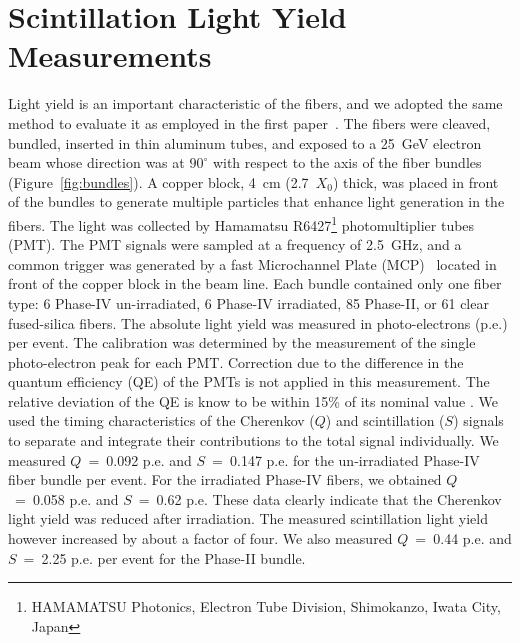 \documentclass[a4paper,11pt]{article}
\begin{document}
\section{Scintillation Light Yield Measurements}
\label{sec:lightyield}
Light yield is an important characteristic of the fibers, and we adopted the same method to evaluate it as employed in the first paper~\cite{JINSTPaper}.   The fibers were cleaved, bundled, inserted in thin aluminum tubes, and exposed to a 25~GeV electron beam whose direction was at $90^{\circ}$ with respect to the axis of the fiber bundles (Figure~\ref{fig:bundles}). A copper block, 4~cm (2.7~$X_0$) thick, was placed in front of the bundles to generate multiple particles that enhance light generation in the fibers. The light was collected by Hamamatsu R6427\footnote{HAMAMATSU Photonics, Electron Tube Division, Shimokanzo, Iwata City, Japan} photomultiplier tubes (PMT). The PMT signals were sampled at a frequency of 2.5~GHz, and a common trigger was generated by a fast Microchannel Plate (MCP)~\cite{r-MCP} located in front of the copper block in the beam line. Each bundle contained only one fiber type: 6 Phase-IV un-irradiated, 6 Phase-IV irradiated, 85 Phase-II, or 61 clear fused-silica fibers. The absolute light yield was measured in photo-electrons (p.e.) per event. The calibration was determined by the measurement of the single photo-electron peak for each PMT. Correction due to the difference in the quantum efficiency (QE) of the PMTs is not applied in this measurement. The relative deviation of the QE is know to be within 15\% of its nominal value . We used the timing characteristics of the Cherenkov ($Q$) and scintillation ($S$) signals to separate and integrate their contributions to the total signal individually. We measured $Q$~=~0.092 p.e. and $S$~=~0.147 p.e. for the un-irradiated Phase-IV fiber bundle per event. For the irradiated Phase-IV fibers, we obtained $Q$~=~0.058 p.e. and $S$~=~0.62 p.e.  These data clearly indicate that the Cherenkov light yield was reduced after irradiation. The measured scintillation light yield however increased by about a factor of four. We also measured $Q$~=~0.44 p.e. and $S$~=~2.25 p.e. per event for the Phase-II bundle.
\end{document}
